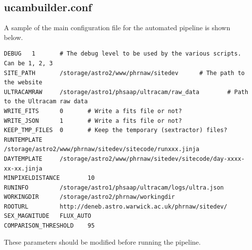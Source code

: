 \subsection{ucambuilder.conf}
A sample of the main configuration file for the automated pipeline is shown below.
\lstset{basicstyle=\scriptsize}
\begin{lstlisting}
DEBUG   1       # The debug level to be used by the various scripts. Can be 1, 2, 3
SITE_PATH       /storage/astro2/www/phrnaw/sitedev      # The path to the website
ULTRACAMRAW     /storage/astro1/phsaap/ultracam/raw_data        # Path to the Ultracam raw data
WRITE_FITS      0       # Write a fits file or not?
WRITE_JSON      1       # Write a fits file or not?
KEEP_TMP_FILES  0       # Keep the temporary (sextractor) files?
RUNTEMPLATE     /storage/astro2/www/phrnaw/sitedev/sitecode/runxxx.jinja
DAYTEMPLATE     /storage/astro2/www/phrnaw/sitedev/sitecode/day-xxxx-xx-xx.jinja
MINPIXELDISTANCE        10
RUNINFO         /storage/astro1/phsaap/ultracam/logs/ultra.json
WORKINGDIR      /storage/astro2/phrnaw/workingdir
ROOTURL         http://deneb.astro.warwick.ac.uk/phrnaw/sitedev/
SEX_MAGNITUDE   FLUX_AUTO
COMPARISON_THRESHOLD    95
\end{lstlisting}

These parameters should be modified before running the pipeline.

